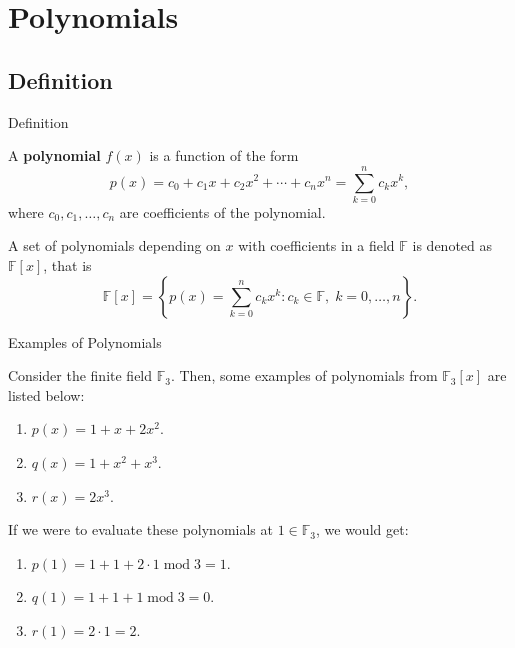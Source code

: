 \documentclass{beamer}
\begin{document}
    \section{Polynomials}

    \subsection{Definition}

    \begin{frame}{Definition}
      \begin{definition}
        A \textbf{polynomial} $f(x)$ is a function of the form
        \begin{equation*}
            p(x) = c_0 + c_1 x + c_2 x^2 + \cdots + c_n x^n = \sum_{k=0}^{n} c_k x^k,
        \end{equation*}
        where $c_0, c_1, \dots, c_n$ are coefficients of the polynomial.
    \end{definition}
    \pause
    
    \begin{definition}
        A set of polynomials depending on $x$ with coefficients in a field $\mathbb{F}$ is denoted as $\mathbb{F}[x]$, that is
        \begin{equation*}
            \mathbb{F}[x] = \left\{p(x) = \sum_{k=0}^{n} c_k x^k: c_k \in \mathbb{F}, \; k = 0,\dots,n\right\}.
        \end{equation*}
    \end{definition}
    \end{frame}

    \begin{frame}{Examples of Polynomials}
      \begin{example}
        Consider the finite field $\mathbb{F}_3$. Then, some examples of polynomials from $\mathbb{F}_3[x]$ are listed below:
        \begin{enumerate}
            \item $p(x) = 1 + x + 2x^2$.
            \item $q(x) = 1 + x^2 + x^3$.
            \item $r(x) = 2x^3$.
        \end{enumerate}
        \pause
    
       If we were to evaluate these polynomials at $1 \in \mathbb{F}_3$, we would get:
        \begin{enumerate}
            \item $p(1) = 1 + 1 + 2 \cdot 1 \; \text{mod} \; 3 = 1$.
            \item $q(1) = 1 + 1 + 1 \; \text{mod} \; 3 = 0$.
            \item $r(1) = 2 \cdot 1 = 2$.
        \end{enumerate}
    \end{example}
    \end{frame}    
\end{document}
